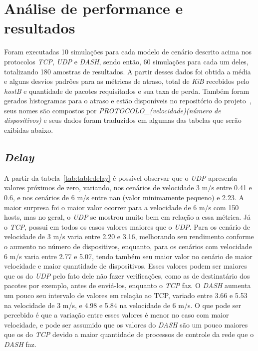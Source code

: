 \documentclass[12pt]{article}
\begin{document}
\section{Análise de performance e resultados} \label{sec:analise}
	Foram executadas 10 simulações para cada modelo de cenário descrito acima nos protocolos \textit{TCP}, \textit{UDP} e \textit{DASH}, sendo então, 60 simulações para cada um deles, totalizando 180 amostras de resultados. A partir desses dados foi obtida a média e alguns desvios padrões para as métricas de atraso, total de \textit{KiB} recebidos pelo \textit{hostB} e quantidade de pacotes requisitados e sua taxa de perda. Também foram gerados histogramas para o atraso e estão disponíveis no repositório do projeto~\cite{ic}, seus nomes são compostos por \textit{PROTOCOLO\_(velocidade)(número de dispositivos)} e seus dados foram traduzidos em algumas das tabelas que serão exibidas abaixo.

\subsection{\textit{Delay}}

	A partir da tabela~\ref{tab:tabledelay} é possível observar que o \textit{UDP} apresenta valores próximos de zero, variando, nos cenários de velocidade 3 m/s entre 0.41 e 0.6, e nos cenários de 6 m/s entre nan (valor minimamente pequeno) e 2.23. A maior surpresa foi o maior valor ocorrer para a velocidade de 6 m/s com 150 hosts, mas no geral, o \textit{UDP} se mostrou muito bem em relação a essa métrica. Já o \textit{TCP}, possui em todos os casos valores maiores que o \textit{UDP}. Para os cenário de velocidade de 3 m/s varia entre 2.20 e 3.16, melhorando seu rendimento conforme o aumento no número de dispositivos, enquanto, para os cenários com velocidade 6 m/s varia entre 2.77 e 5.07, tendo também seu maior valor no cenário de maior velocidade e maior quantidade de dispositivos. Esses valores podem ser maiores que os do \textit{UDP} pelo fato dele não fazer verificações, como as de destinatário dos pacotes por exemplo, antes de enviá-los, enquanto o \textit{TCP} faz. O \textit{DASH} aumenta um pouco seu intervalo de valores em relação ao TCP, variado entre 3.66 e 5.53  na velocidade de 3 m/s, e 4.98 e 5.84 na velocidade de 6 m/s. O que pode ser percebido é que a variação entre esses valores é menor no caso com maior velocidade, e pode ser assumido que os valores do \textit{DASH} são um pouco maiores que os do \textit{TCP} devido a maior quantidade de processos de controle da rede que o \textit{DASH} faz.
\end{document}

